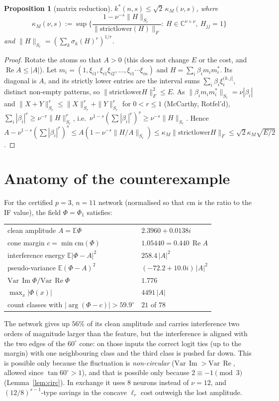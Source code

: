 \documentclass[11pt]{article}
\newtheorem{proposition}[theorem]{Proposition}
\theoremstyle{definition}
\newcommand{\E}{\mathbb{E}}
\renewcommand{\Re}{\operatorname{Re}}
\renewcommand{\Im}{\operatorname{Im}}
\begin{document}
\begin{proposition}[matrix reduction]\label{prop:mat}
$k^*(n,s)\le\sqrt2\,\kappa_M(\nu,s)$, where
\[\kappa_M(\nu,s):=\sup\Big\{\frac{1-\nu^{-s}\|H\|_{S_{r}}}{\|\mathrm{strictlower}(H)\|_F}:\ H\in\mathbb C^{\nu\times\nu},\ H_{jj}=1\Big\}\]
and $\|H\|_{S_r}=(\sum_k\sigma_k(H)^r)^{1/r}$.
\end{proposition}
\begin{proof}
Rotate the atoms so that $A>0$ (this does not change $E$ or the cost, and $\Re A\le|A|$).  Let
$m_i=(1,\xi_{i1},\xi_{i1}\xi_{i2},\dots,\xi_{i1}\cdots\xi_{in})$ and $H=\sum_i\beta_im_im_i^*$.  Its diagonal is $A$,
and its strictly lower entries are the interval sums $\sum_i\beta_i\xi_i^{(k,j]}$, distinct non-empty patterns, so
$\|\mathrm{strictlower}H\|_F^2\le E$.  As $\|\beta_im_im_i^*\|_{S_r}=\nu|\beta_i|$ and
$\|X+Y\|_{S_r}^r\le\|X\|_{S_r}^r+\|Y\|_{S_r}^r$ for $0<r\le1$ (McCarthy, Rotfel'd),
$\sum_i|\beta_i|^r\ge\nu^{-r}\|H\|_{S_r}^r$, i.e.\ $\nu^{1-s}(\sum|\beta_i|^r)^s\ge\nu^{-s}\|H\|_{S_r}$.  Hence
$A-\nu^{1-s}(\sum|\beta_i|^r)^s\le A(1-\nu^{-s}\|H/A\|_{S_r})\le\kappa_M\|\mathrm{strictlower}H\|_F\le\sqrt2\kappa_M\sqrt{E/2}$.
\end{proof}

\section{Anatomy of the counterexample}
For the certified $p=3$, $n=11$ network (normalised so that $\mathrm{cm}$ is the ratio to the IF value), the field
$\Phi=\Phi_1$ satisfies:
\begin{center}
\begin{tabular}{ll}
\toprule
clean amplitude $A=\E\Phi$ & $2.3960+0.0138i$ \\
cone margin $c=\min\mathrm{cm}(\Phi)$ & $1.05440=0.440\,\Re A$ \\
interference energy $\E|\Phi-A|^2$ & $258.4\,|A|^2$ \\
pseudo-variance $\E(\Phi-A)^2$ & $(-72.2+10.0i)\,|A|^2$ \\
$\mathrm{Var}\,\Im\Phi/\mathrm{Var}\,\Re\Phi$ & $1.776$ \\
$\max_x|\Phi(x)|$ & $4491\,|A|$ \\
count classes with $|\arg(\Phi-c)|>59.9^\circ$ & $21$ of $78$ \\
\bottomrule
\end{tabular}
\end{center}
The network gives up $56\%$ of its clean amplitude and carries interference two orders of magnitude larger than the
feature, but the interference is aligned with the two edges of the $60^\circ$ cone: on those inputs the correct logit
ties (up to the margin) with one neighbouring class and the third class is pushed far down.  This is possible only
because the fluctuation is \emph{non-circular} ($\mathrm{Var}\,\Im>\mathrm{Var}\,\Re$, allowed since $\tan60^\circ>1$),
and that is possible only because $2\equiv-1\pmod3$ (Lemma~\ref{lem:circ}).  In exchange it uses $8$ neurons instead of
$\nu=12$, and $(12/8)^{s-1}$-type savings in the concave $\ell_r$ cost outweigh the lost amplitude.
\end{document}
